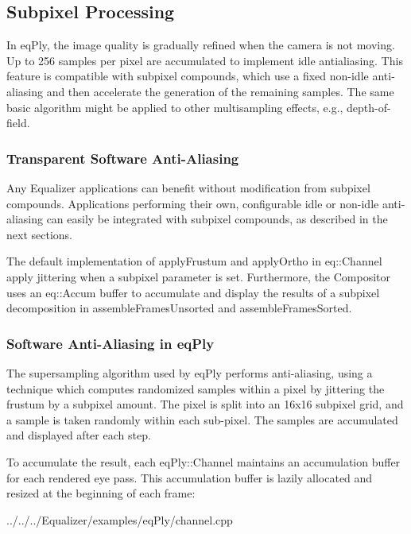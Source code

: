 \documentclass[10pt,a4]{scrartcl}
\begin{document}
\subsection{\label{sFSAA}Subpixel Processing}

In eqPly, the image quality is gradually refined when the camera is not
moving. Up to 256 samples per pixel are accumulated to implement idle
antialiasing. This feature is compatible with subpixel compounds, which use a
fixed non-idle anti-aliasing and then accelerate the generation of the remaining
samples. The same basic algorithm might be applied to other multisampling
effects, e.g., depth-of-field.

\subsubsection{Transparent Software Anti-Aliasing}

Any Equalizer applications can benefit without modification from subpixel
compounds. Applications performing their own, configurable idle or non-idle
anti-aliasing can easily be integrated with subpixel compounds, as described in
the next sections.

The default implementation of \textsf{applyFrustum} and \textsf{applyOrtho} in
\textsf{eq::Channel} apply jittering when a subpixel parameter is set.
Furthermore, the \textsf{Compositor} uses an \textsf{eq::Accum} buffer to
accumulate and display the results of a subpixel decomposition in \textsf{assembleFramesUnsorted} and \textsf{assembleFramesSorted}.

\subsubsection{Software Anti-Aliasing in eqPly}

The supersampling algorithm used by eqPly performs anti-aliasing, using a
technique which computes randomized samples within a pixel by jittering the
frustum by a subpixel amount. The pixel is split into an 16x16 subpixel grid,
and a sample is taken randomly within each sub-pixel. The samples are
accumulated and displayed after each step.

To accumulate the result, each \textsf{eqPly::Channel} maintains an accumulation
buffer for each rendered eye pass. This accumulation buffer is lazily allocated
and resized at the beginning of each frame:

{\footnotesize
  {../../../Equalizer/examples/eqPly/channel.cpp}}
\end{document}
